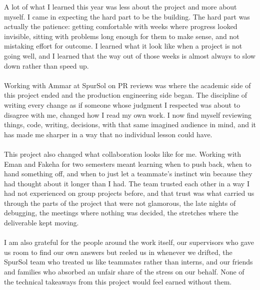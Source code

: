 A lot of what I learned this year was less about the project and more about myself. I came in expecting the hard part to be the building. The hard part was actually the patience: getting comfortable with weeks where progress looked invisible, sitting with problems long enough for them to make sense, and not mistaking effort for outcome. I learned what it look like when a project is not going well, and I learned that the way out of those weeks is almost always to slow down rather than speed up.
\\\\
Working with Ammar at SpurSol on PR reviews was where the academic side of this project ended and the production engineering side began. The discipline of writing every change as if someone whose judgment I respected was about to disagree with me, changed how I read my own work. I now find myself reviewing things, code, writing, decisions, with that same imagined audience in mind, and it has made me sharper in a way that no individual lesson could have.
\\\\
This project also changed what collaboration looks like for me. Working with Eman and Fakeha for two semesters meant learning when to push back, when to hand something off, and when to just let a teammate's instinct win because they had thought about it longer than I had. The team trusted each other in a way I had not experienced on group projects before, and that trust was what carried us through the parts of the project that were not glamorous, the late nights of debugging, the meetings where nothing was decided, the stretches where the deliverable kept moving.
\\\\
I am also grateful for the people around the work itself, our supervisors who gave us room to find our own answers but reeled us in whenever we drifted, the SpurSol team who treated us like teammates rather than interns, and our friends and families who absorbed an unfair share of the stress on our behalf. None of the technical takeaways from this project would feel earned without them.

